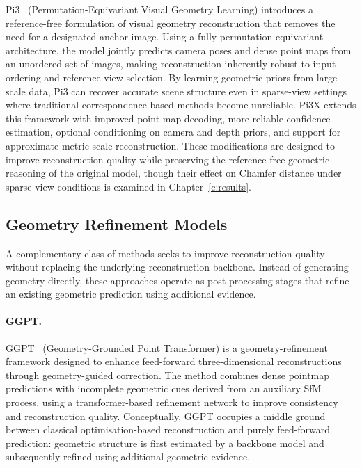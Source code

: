 Pi3~\cite{pi3} (Permutation-Equivariant Visual Geometry Learning) introduces a reference-free formulation of visual geometry reconstruction that removes the need for a designated anchor image. Using a fully permutation-equivariant architecture, the model jointly predicts camera poses and dense point maps from an unordered set of images, making reconstruction inherently robust to input ordering and reference-view selection. By learning geometric priors from large-scale data, Pi3 can recover accurate scene structure even in sparse-view settings where traditional correspondence-based methods become unreliable. Pi3X extends this framework with improved point-map decoding, more reliable
confidence estimation, optional conditioning on camera and depth priors, and
support for approximate metric-scale reconstruction. These modifications are
designed to improve reconstruction quality while preserving the reference-free
geometric reasoning of the original model, though their effect on Chamfer
distance under sparse-view conditions is examined in Chapter~\ref{c:results}.

\subsection{Geometry Refinement Models}
\label{sec:refinement_models}

A complementary class of methods seeks to improve reconstruction quality without replacing the underlying reconstruction backbone. Instead of generating geometry directly, these approaches operate as post-processing stages that refine an existing geometric prediction using additional evidence.

\paragraph{GGPT.}

GGPT~\cite{ggpt} (Geometry-Grounded Point Transformer) is a geometry-refinement framework designed to enhance feed-forward three-dimensional reconstructions through geometry-guided correction. The method combines dense pointmap predictions with incomplete geometric cues derived from an auxiliary SfM process, using a transformer-based refinement network to improve consistency and reconstruction quality. Conceptually, GGPT occupies a middle ground between classical optimisation-based reconstruction and purely feed-forward prediction: geometric structure is first estimated by a backbone model and subsequently refined using additional geometric evidence.

